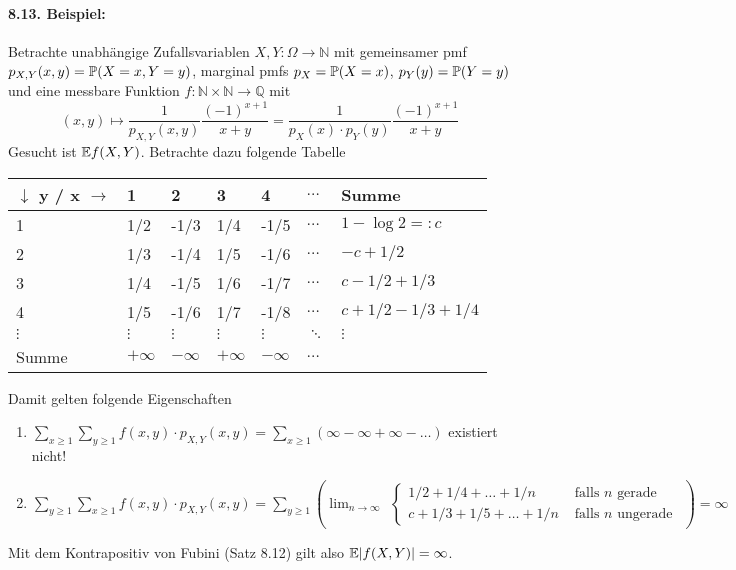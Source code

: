 \documentclass[11pt]{report}
\begin{document}
\paragraph{8.13. Beispiel:}Betrachte unabh\"angige Zufallsvariablen $X,Y:\Omega\to\mathbb{N}$ mit gemeinsamer pmf $p_{X,Y}(x,y)=\mathbb{P}(X=x,Y=y)$, marginal pmfs $p_X=\mathbb{P}(X=x)$, $p_Y(y)=\mathbb{P}(Y=y)$ und eine messbare Funktion $f:\mathbb{N}\times\mathbb{N}\to\mathbb{Q}$ mit 
$$(x,y)\mapsto\dfrac{1}{p_{X,Y}(x,y)}\dfrac{(-1)^{x+1}}{x+y}=\dfrac{1}{p_X(x)\cdot p_Y(y)}\dfrac{(-1)^{x+1}}{x+y}$$
Gesucht ist $\mathbb{E} f(X,Y)$. Betrachte dazu folgende Tabelle\newline
\begin{center}
\begin{tabular}{l|lllll|l}
$\downarrow$ y / x $\rightarrow$ & 1 & 2 & 3 & 4 & $\hdots$ & Summe \\
\hline
1   & 1/2  & -1/3  & 1/4  & -1/5  &  $\hdots$  &  $1-\log 2=:c$   \\
2   &  1/3 & -1/4  & 1/5  & -1/6  &  $\hdots$   &  $-c+1/2$   \\
3   &  1/4 & -1/5  & 1/6  & -1/7  &  $\hdots$   & $c-1/2+1/3$    \\
4   &  1/5 &  -1/6 & 1/7  &  -1/8 &  $\hdots$   &  $c+1/2-1/3+1/4$   \\
$\vdots$ &  $\vdots$  & $\vdots$   &  $\vdots$  & $\vdots$   &  $\ddots$   &  $\vdots$    \\
\hline
Summe &  $+\infty$ & $-\infty$  & $+\infty$  & $-\infty$  &  $\hdots$   &    
\end{tabular}
\end{center}
Damit gelten folgende Eigenschaften
\begin{enumerate}[label=(\roman*)]
    \item $\displaystyle\sum_{x\geq1}\sum_{y\geq1}f(x,y)\cdot p_{X,Y}(x,y)=\sum_{x\geq1}(\infty-\infty+\infty-\hdots)$ existiert nicht!
    \item $\displaystyle\sum_{y\geq1}\sum_{x\geq1}f(x,y)\cdot p_{X,Y}(x,y)=\sum_{y\geq1}\left(\lim_{n\to\infty}\begin{aligned}\begin{cases}
        1/2+1/4+\hdots+1/n&\text{ falls }n\text{ gerade}\\
        c+1/3+1/5+\hdots+1/n&\text{ falls }n\text{ ungerade}
    \end{cases}\end{aligned}\right)=\infty$
\end{enumerate}
Mit dem Kontrapositiv von Fubini (Satz 8.12) gilt also $\mathbb{E}|f(X,Y)|=\infty$.
\end{document}
